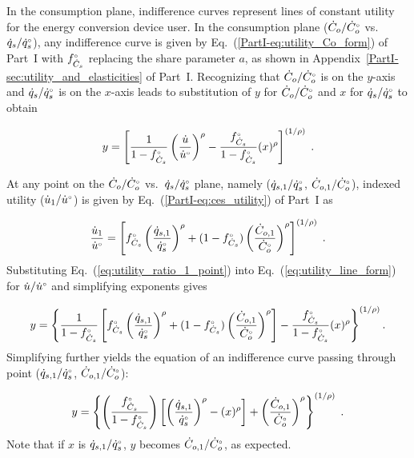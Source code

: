 In the consumption plane,
indifference curves represent lines of constant utility
for the energy conversion device user.
In the consumption plane
($\dot{C}_o/{}{\dot{C}}^{\scriptscriptstyle \circ}_o$ vs.\ $\dot{q}_s/{}{\dot{q}}^{\scriptscriptstyle \circ}_s$), 
any indifference curve 
is given by 
Eq.~(\ref{PartI-eq:utility_Co_form}) of Part~I
with ${}{f}^{\scriptscriptstyle \circ}_{\dot{C}_s}$ replacing the share parameter $a$, 
as shown in Appendix~\ref{PartI-sec:utility_and_elasticities} of Part~I.
Recognizing that 
$\dot{C}_o/{}{\dot{C}}^{\scriptscriptstyle \circ}_o$ is on the $y$-axis and 
$\dot{q}_s/{}{\dot{q}}^{\scriptscriptstyle \circ}_s$ is on the $x$-axis
leads to substitution of 
$y$ for $\dot{C}_o/{}{\dot{C}}^{\scriptscriptstyle \circ}_o$ and 
$x$ for $\dot{q}_s/{}{\dot{q}}^{\scriptscriptstyle \circ}_s$ to obtain

\begin{equation} \label{eq:utility_line_form}
  y = \left[ \frac{1}{1 - {}{f}^{\scriptscriptstyle \circ}_{\dot{C}_s}} \left( \frac{\dot{u}}{{}{\dot{u}}^{\scriptscriptstyle \circ}} \right)^\rho 
            - \frac{{}{f}^{\scriptscriptstyle \circ}_{\dot{C}_s}}{1 - {}{f}^{\scriptscriptstyle \circ}_{\dot{C}_s}} (x)^\rho \right]^{(1/\rho)} \; .
\end{equation}

At any point on the 
$\dot{C}_o/{}{\dot{C}}^{\scriptscriptstyle \circ}_o$ vs.\ $\dot{q}_s/{}{\dot{q}}^{\scriptscriptstyle \circ}_s$ plane,
namely ($\dot{q}_{s,1}/{}{\dot{q}}^{\scriptscriptstyle \circ}_s$, $\dot{C}_{o,1}/{}{\dot{C}}^{\scriptscriptstyle \circ}_o$),
indexed utility ($\dot{u}_1/{}{\dot{u}}^{\scriptscriptstyle \circ}$) is given by Eq.~(\ref{PartI-eq:ces_utility}) of Part~I as

\begin{equation} \label{eq:utility_ratio_1_point}
  \frac{\dot{u}_1}{{}{\dot{u}}^{\scriptscriptstyle \circ}} =
        \left[ {}{f}^{\scriptscriptstyle \circ}_{\dot{C}_s} \left( \frac{\dot{q}_{s,1}}{{}{\dot{q}}^{\scriptscriptstyle \circ}_s} \right)^\rho
        + (1-{}{f}^{\scriptscriptstyle \circ}_{\dot{C}_s}) \left( \frac{\dot{C}_{o,1}}{{}{\dot{C}}^{\scriptscriptstyle \circ}_o} \right)^\rho  \right]^{(1/\rho)} \; .
\end{equation}
%
Substituting Eq.~(\ref{eq:utility_ratio_1_point}) into Eq.~(\ref{eq:utility_line_form})
for $\dot{u}/{}{\dot{u}}^{\scriptscriptstyle \circ}$
and simplifying exponents gives

\begin{equation}
  y = \left\{ \frac{1}{1 - {}{f}^{\scriptscriptstyle \circ}_{\dot{C}_s}} \left[ {}{f}^{\scriptscriptstyle \circ}_{\dot{C}_s} \left( \frac{\dot{q}_{s,1}}{{}{\dot{q}}^{\scriptscriptstyle \circ}_s} \right)^\rho 
        + (1-{}{f}^{\scriptscriptstyle \circ}_{\dot{C}_s}) \left( \frac{\dot{C}_{o,1}}{{}{\dot{C}}^{\scriptscriptstyle \circ}_o} \right)^\rho   \right] 
            - \frac{{}{f}^{\scriptscriptstyle \circ}_{\dot{C}_s}}{1 - {}{f}^{\scriptscriptstyle \circ}_{\dot{C}_s}} (x)^\rho \right\}^{(1/\rho)}  .
\end{equation}
%
Simplifying further yields
the equation of an indifference curve passing through point 
($\dot{q}_{s,1}/{}{\dot{q}}^{\scriptscriptstyle \circ}_s$, $\dot{C}_{o,1}/{}{\dot{C}}^{\scriptscriptstyle \circ}_o$):

\begin{equation} \label{eq:indiff_curve_eqn}
  y = \left\{ \left( \frac{{}{f}^{\scriptscriptstyle \circ}_{\dot{C}_s}}{1 - {}{f}^{\scriptscriptstyle \circ}_{\dot{C}_s}} \right) \left[ \left( \frac{\dot{q}_{s,1}}{{}{\dot{q}}^{\scriptscriptstyle \circ}_s} \right)^\rho 
                                                          - (x)^\rho  \right]
        + \left( \frac{\dot{C}_{o,1}}{{}{\dot{C}}^{\scriptscriptstyle \circ}_{o}} \right)^\rho \right\}^{(1/\rho)} \; .
\end{equation}
%
Note that if $x$ is $\dot{q}_{s,1}/{}{\dot{q}}^{\scriptscriptstyle \circ}_s$,
$y$ becomes $\dot{C}_{o,1}/{}{\dot{C}}^{\scriptscriptstyle \circ}_o$,
as expected.
